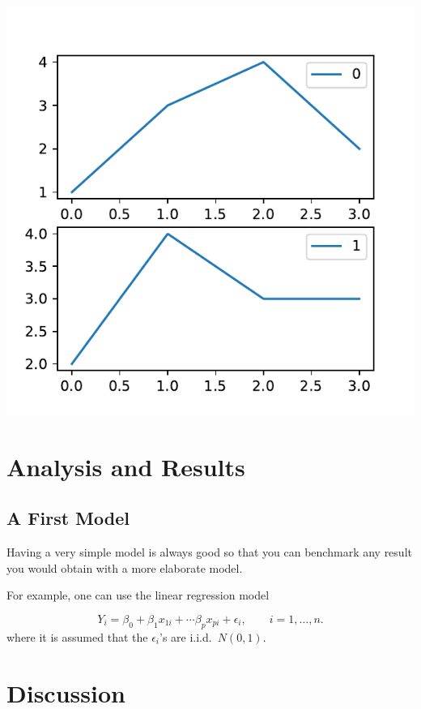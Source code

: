 \documentclass[mstat,12pt]{unswthesis}
\begin{document}
\includegraphics{unsw-ZZSC9020-report-template_files/figure-latex/unnamed-chunk-2-1.pdf}

\hypertarget{analysis-and-results}{%
\chapter{Analysis and Results}\label{analysis-and-results}}

\hypertarget{a-first-model}{%
\section{A First Model}\label{a-first-model}}

Having a very simple model is always good so that you can benchmark any
result you would obtain with a more elaborate model.

\bigskip

For example, one can use the linear regression model

\[
Y_i = \beta_0 + \beta_1 x_{1i} + \cdots \beta_p x_{pi} + \epsilon_i, \qquad i=1,\ldots,n.
\] where it is assumed that the \(\epsilon_i\)'s are i.i.d.~\(N(0,1)\).

\hypertarget{discussion}{%
\chapter{Discussion}\label{discussion}}
\end{document}
